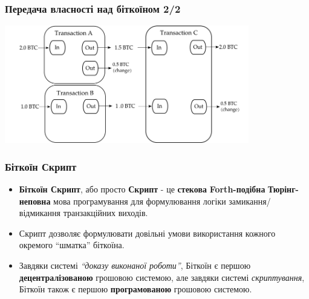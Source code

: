 \documentclass{beamer}
\begin{document}
\begin{frame}[fragile]
  \frametitle{Передача власності над біткоїном 2/2}
  \begin{center}
    \includegraphics[width=0.8\textwidth]{transactions}
  \end{center}
\end{frame}

\begin{frame}[fragile]
  \frametitle{Біткоїн Скрипт}
  \begin{itemize}
  \item \textbf{Біткоїн Скрипт}, або просто \textbf{Скрипт} - це
    \textbf{стекова} \textbf{Forth-подібна} \textbf{Тюрінг-неповна} мова програмування
    для формулювання логіки замикання/відмикання транзакційних виходів.
  \item Скрипт дозволяє формулювати довільні умови використання кожного окремого
    ``шматка'' біткоїна.
  \item Завдяки системі \textit{``доказу виконаної роботи''}, Біткоїн є першою
    \textbf{децентралізованою} грошовою системою, але завдяки системі
    \textit{скриптування}, Біткоїн також є першою \textbf{програмованою}
    грошовою системою.
  \end{itemize}
\end{frame}
\end{document}
